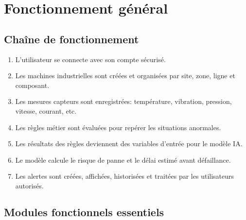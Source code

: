 \documentclass[10pt,a4paper]{article}
\begin{document}
\newpage

\section{Fonctionnement général}

\subsection{Chaîne de fonctionnement}

\begin{enumerate}[leftmargin=0.8cm,itemsep=0.2em]
  \item L'utilisateur se connecte avec son compte sécurisé.
  \item Les machines industrielles sont créées et organisées par site, zone, ligne et composant.
  \item Les mesures capteurs sont enregistrées: température, vibration, pression, vitesse, courant, etc.
  \item Les règles métier sont évaluées pour repérer les situations anormales.
  \item Les résultats des règles deviennent des variables d'entrée pour le modèle IA.
  \item Le modèle calcule le risque de panne et le délai estimé avant défaillance.
  \item Les alertes sont créées, affichées, historisées et traitées par les utilisateurs autorisés.
\end{enumerate}

\subsection{Modules fonctionnels essentiels}
\end{document}
